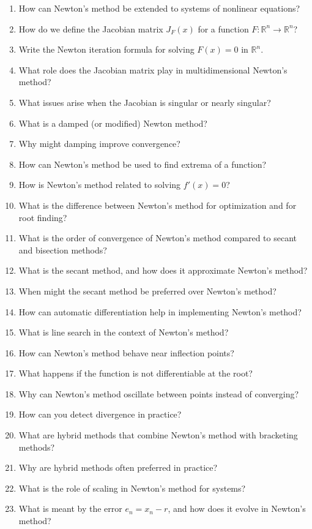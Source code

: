 \begin{enumerate}
  \item How can Newton's method be extended to systems of nonlinear equations?
  \item How do we define the Jacobian matrix \(J_{F}(x)\) for a function \(F : \mathbb{R}^{n} \to \mathbb{R}^{n}\)?
  \item Write the Newton iteration formula for solving \(F(x) = 0\) in \(\mathbb{R}^{n}\).
  \item What role does the Jacobian matrix play in multidimensional Newton's method?
  \item What issues arise when the Jacobian is singular or nearly singular?
  \item What is a damped (or modified) Newton method?
  \item Why might damping improve convergence?
  \item How can Newton's method be used to find extrema of a function?
  \item How is Newton's method related to solving \(f'(x) = 0\)?
  \item What is the difference between Newton's method for optimization and for root finding?
  \item What is the order of convergence of Newton's method compared to secant and bisection methods?
  \item What is the secant method, and how does it approximate Newton's method?
  \item When might the secant method be preferred over Newton's method?
  \item How can automatic differentiation help in implementing Newton's method?
  \item What is line search in the context of Newton's method?
  \item How can Newton's method behave near inflection points?
  \item What happens if the function is not differentiable at the root?
  \item Why can Newton's method oscillate between points instead of converging?
  \item How can you detect divergence in practice?
  \item What are hybrid methods that combine Newton's method with bracketing methods?
  \item Why are hybrid methods often preferred in practice?
  \item What is the role of scaling in Newton's method for systems?
  \item What is meant by the error \(e_{n} = x_{n} - r\), and how does it evolve in Newton's method?

\end{enumerate}
